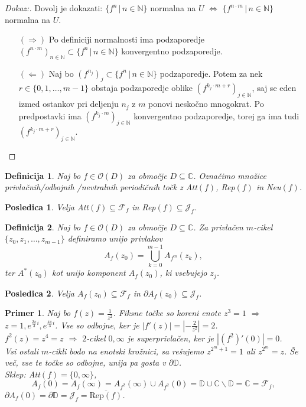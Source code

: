 \documentclass{article}
\newtheorem{definicija}{Definicija}
\newtheorem{posledica}{Posledica}
\newtheorem{primer}{Primer}
\newcommand{\C}{\mathbb{C}}
\newcommand{\D}{\mathbb{D}}
\newcommand{\N}{\mathbb{N}}
\newcommand{\F}{\mathcal{F}}
\newcommand{\Ho}{\mathcal{O}}
\begin{document}
\begin{proof}[Dokaz:]
Dovolj je dokazati: $\{f^n \,|\, n\in\N\}$ normalna na $U$ $\iff$ 
$\{f^{n\cdot m} \,|\, n\in\N\}$ normalna na $U$.
\begin{enumerate}
    \item[$(\Longrightarrow)$] Po definiciji normalnosti ima podzaporedje $(f^{n\cdot m})_{n\in\N} \subset \{f^n \,|\, n\in\N\}$
    konvergentno podzaporedje.
    \item[$(\Longleftarrow)$] Naj bo $(f^{n_j})_j \subset \{f^n \,|\, n\in\N\}$ podzaporedje. 
    Potem za nek $r\in \{0, 1, \dots, m-1\}$ obstaja podzaporedje 
    oblike $(f^{k_j \cdot m + r})_{j\in\N}$, saj se eden izmed ostankov 
    pri deljenju $n_j$ z $m$ ponovi neskočno mnogokrat. Po predpostavki 
    ima $(f^{k_j \cdot m})_{j\in\N}$ konvergentno podzaporedje, torej ga ima 
    tudi $(f^{k_j \cdot m + r})_{j\in\N}$.
\end{enumerate}
\end{proof}

\begin{definicija}
Naj bo $f\in \Ho(D)$ za območje $D \subseteq \C$. Označimo množice 
privlačnih\slash odbojnih \slash nevtralnih periodičnih točk z 
Att$(f)$, Rep$(f)$ in Neu$(f)$.
\end{definicija}

\begin{posledica}
Velja Att$(f) \subseteq \F_f$ in Rep$(f) \subseteq \mathcal{J}_f$.
\end{posledica}

\begin{definicija}
Naj bo $f\in \Ho(D)$ za območje $D \subseteq \C$. Za privlačen 
$m$-cikel $\{z_0, z_1, \dots, z_{m-1}\}$ definiramo unijo privlakov
$$
A_f(z_0) = \bigcup_{k=0}^{m-1} A_{f^m}(z_k),
$$
ter $A^*(z_0)$ kot unijo komponent $A_f(z_0)$, ki vsebujejo $z_j$.
\end{definicija}

\begin{posledica}
Velja $A_f(z_0) \subseteq \F_f$ in $\partial A_f(z_0) \subseteq \mathcal{J}_f$.
\end{posledica}

\begin{primer}
Naj bo $f(z) = \frac{1}{z^2}$. Fiksne točke so koreni enote
$z^3 = 1$ $\Longrightarrow$ $z = 1, e^{\frac{2\pi}{3}i}, e^{\frac{4\pi}{3}i}$. 
Vse so odbojne, ker je $|f'(z)| = \left|- \frac{2}{z^2}\right| = 2$. \\
$f^2(z) = z^4 = z$ $\Longrightarrow$ $2$-cikel $0, \infty$ je superprivlačen,
ker je $|(f^2)'(0)| = 0$. \\
Vsi ostali $m$-cikli bodo na enotski krožnici, sa rešujemo $z^{2^m + 1} = 1$
ali $z^{2^m} = z$. Še več, vse te točke so odbojne, unija pa gosta 
v $\partial \D$. \\[1mm] 
Sklep: Att$(f) = \{0, \infty\}$, 
$$
A_f(0) = A_f(\infty) = A_{f^2}(\infty) \cup A_{f^2}(0) = \D \cup \C \backslash \D = \C = \F_f,
$$
$\partial A_f(0) = \partial \D = \mathcal{J}_f = \overline{\text{Rep}(f)}$.
\end{primer}
\end{document}
